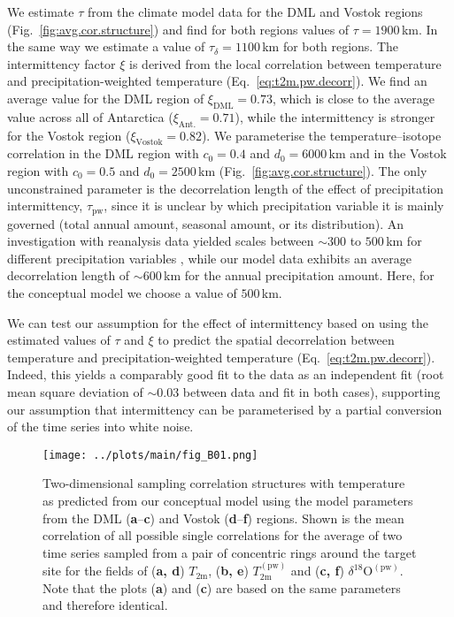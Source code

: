 \documentclass[cp, manuscript]{copernicus}
\begin{document}
We estimate $\tau$ from the climate model data for the DML and Vostok regions
(Fig.~\ref{fig:avg.cor.structure}) and find for both regions values of
$\tau=1900$\,km. In the same way we estimate a value of $\tau_{\delta}=1100$\,km
for both regions. The intermittency factor $\xi$ is derived from the local
correlation between temperature and precipitation-weighted temperature
(Eq.~\ref{eq:t2m.pw.decorr}). We find an average value for the DML region of
$\xi_{\mathrm{DML}}=0.73$, which is close to the average value across all of
Antarctica ($\xi_{\mathrm{Ant.}}=0.71$), while the intermittency is stronger for
the Vostok region ($\xi_{\mathrm{Vostok}}=0.82$). We parameterise the
temperature--isotope correlation in the DML region with $c_0=0.4$ and
$d_0=6000$\,km and in the Vostok region with $c_0=0.5$ and $d_0=2500$\,km
(Fig.~\ref{fig:avg.cor.structure}). The only unconstrained parameter is the
decorrelation length of the effect of precipitation intermittency,
$\tau_{\mathrm{pw}}$, since it is unclear by which precipitation variable it is
mainly governed (total annual amount, seasonal amount, or its distribution). An
investigation with reanalysis data yielded scales between $\sim300$ to $500$\,km
for different precipitation variables \citep{Munch2018a}, while our model data
exhibits an average decorrelation length of $\sim600$\,km for the annual
precipitation amount. Here, for the conceptual model we choose a value of
$500$\,km.

We can test our assumption for the effect of intermittency based on using the
estimated values of $\tau$ and $\xi$ to predict the spatial decorrelation
between temperature and precipitation-weighted temperature
(Eq.~\ref{eq:t2m.pw.decorr}). Indeed, this yields a comparably good fit to the
data as an independent fit (root mean square deviation of $\sim0.03$ between
data and fit in both cases), supporting our assumption that intermittency can be
parameterised by a partial conversion of the time series into white noise.

\begin{figure*}[t]%
\centering
\texttt{[image: ../plots/main/fig\_B01.png]}
\caption{%
  Two-dimensional sampling correlation structures with temperature as predicted
  from our conceptual model using the model parameters from the DML
  (\textbf{a}--\textbf{c}) and Vostok (\textbf{d}--\textbf{f}) regions. Shown
  is the mean correlation of all possible single correlations for the average of
  two time series sampled from a pair of concentric rings around the target site
  for the fields of (\textbf{a, d}) $T_{\mathrm{2m}}$, (\textbf{b, e})
  $T_{\mathrm{2m}}^{\mathrm{(pw)}}$ and (\textbf{c, f})
  $\delta^{18}\mathrm{O}^{\mathrm{(pw)}}$. Note that the plots (\textbf{a}) and
  (\textbf{c}) are based on the same parameters and therefore identical.}
\label{fig:conceptual.model}%
\end{figure*}%
\end{document}
